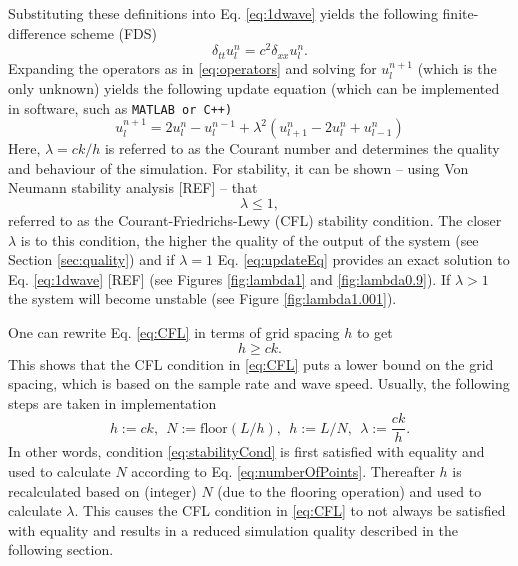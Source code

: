 \documentclass[dvipsnames, preprint]{JASA}
\def\SWcomment[#1]{\textcolor{Bittersweet}{#1}}
\begin{document}
Substituting these definitions into Eq. \eqref{eq:1dwave} yields the following finite-difference scheme (FDS)
\begin{equation}\label{eq:FDS}
    \delta_{tt}u_l^n = c^2 \delta_{xx}u_l^n.
\end{equation}
Expanding the operators as in %
\eqref{eq:operators} and solving for $u_l^{n+1}$ (which is the only unknown) yields the following update equation \SWcomment[(which can be implemented in software, such as {\tt MATLAB} or {\tt C++})]
\begin{equation}\label{eq:updateEq}
    u_l^{n+1} = 2u_l^n-u_l^{n-1} + \lambda^2 \left(u_{l+1}^n-2u_l^n + u_{l-1}^n\right)
\end{equation}
Here, $\lambda = ck/h$ is referred to as the Courant number and determines the quality and behaviour of the simulation. For stability, it can be shown -- using Von Neumann stability analysis [REF] -- that \begin{equation}\label{eq:CFL}
    \lambda \leq 1,
\end{equation}
referred to as the Courant-Friedrichs-Lewy (CFL) stability condition. The closer $\lambda$ is to this condition, the higher the quality of the output of the system (see Section \ref{sec:quality}) and if $\lambda = 1$ Eq. \eqref{eq:updateEq} provides an exact solution to Eq. \eqref{eq:1dwave} %
[REF] (see Figures \ref{fig:lambda1} and \ref{fig:lambda0.9}). If $\lambda > 1$ the system will become unstable (see Figure \ref{fig:lambda1.001}).
\begin{figure}
\end{figure}
One can rewrite Eq. \eqref{eq:CFL} in terms of grid spacing $h$ to get
\begin{equation}\label{eq:stabilityCond}
    h \geq ck.
\end{equation}
This shows that the CFL condition in \eqref{eq:CFL} puts a lower bound on the grid spacing, which is based on the sample rate and wave speed. Usually, the following steps are taken in implementation
\begin{equation}\label{eq:orderOfCalcGrid}
    h := ck,\ \ N := \text{floor}(L/h), \ \ h := L/N, \ \ \lambda := \frac{ck}{h}.
\end{equation}
In other words, condition \eqref{eq:stabilityCond} is first satisfied with equality and used to calculate $N$ according to Eq. \eqref{eq:numberOfPoints}. Thereafter $h$ is recalculated based on (integer) $N$ (due to the flooring operation) and used to calculate $\lambda$. This causes the CFL condition in \eqref{eq:CFL} to not always be satisfied with equality and results in a reduced simulation quality described in the following section.
\end{document}
